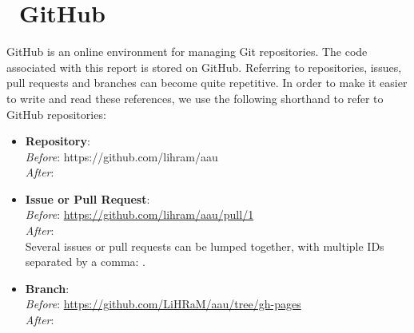 \section*{\faGithub~GitHub}
GitHub is an online environment for managing Git repositories.
The code associated with this report is stored on GitHub.
Referring to repositories, issues, pull requests and branches can become quite repetitive.
In order to make it easier to write and read these references, we use the following shorthand to refer to GitHub repositories:
\begin{itemize}
      \item{
            \textbf{Repository}: \\
            \textit{Before}: https://github.com/lihram/aau\\
            \textit{After}: 
            }
      \item{
            \textbf{Issue or Pull Request}: \\
            \textit{Before}: \url{https://github.com/lihram/aau/pull/1}\\
            \textit{After}: \\
            Several issues or pull requests can be lumped together, with multiple IDs separated by a comma: .
            }
      \item{
            \textbf{Branch}: \\
            \textit{Before}: \url{https://github.com/LiHRaM/aau/tree/gh-pages}\\
            \textit{After}: 
            }
\end{itemize}